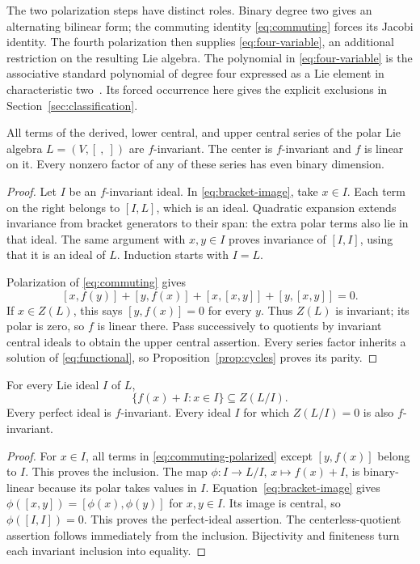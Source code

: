 The two polarization steps have distinct roles. Binary degree two gives
an alternating bilinear form; the commuting identity
\eqref{eq:commuting} forces its Jacobi identity. The fourth polarization
then supplies \eqref{eq:four-variable}, an additional restriction on the
resulting Lie algebra.
The polynomial in \eqref{eq:four-variable} is the associative standard
polynomial of degree four expressed as a Lie element in characteristic
two~\cite[Theorem~9]{Drensky2021}. Its forced occurrence here gives the
explicit exclusions in Section~\ref{sec:classification}.

\begin{proposition}\label{prop:invariant-series}
All terms of the derived, lower central, and upper central series of the
polar Lie algebra \(L=(V,[\ ,\ ])\) are \(f\)-invariant.
The center is \(f\)-invariant and \(f\) is linear on it.
Every nonzero factor of any of these series has even binary dimension.
\end{proposition}
\begin{proof}
Let \(I\) be an \(f\)-invariant ideal. In
\eqref{eq:bracket-image}, take \(x\in I\). Each term on the right belongs
to \([I,L]\), which is an ideal. Quadratic expansion extends invariance
from bracket generators to their span: the extra polar terms also lie in
that ideal. The same argument with \(x,y\in I\) proves invariance of
\([I,I]\), using that it is an ideal of \(L\).
Induction starts with \(I=L\).

Polarization of \eqref{eq:commuting} gives
\begin{equation}\label{eq:commuting-polarized}
 [x,f(y)]+[y,f(x)]+[x,[x,y]]+[y,[x,y]]=0.
\end{equation}
If \(x\in Z(L)\), this says \([y,f(x)]=0\) for every \(y\).
Thus \(Z(L)\) is invariant; its polar is zero, so \(f\) is linear there.
Pass successively to quotients by invariant central ideals to obtain
the upper central assertion. Every series factor inherits a solution of
\eqref{eq:functional}, so Proposition~\ref{prop:cycles} proves its parity.
\end{proof}

\begin{lemma}\label{lem:ideal-descent}
For every Lie ideal \(I\) of \(L\),
\[
 \{f(x)+I:x\in I\}\subseteq Z(L/I).
\]
Every perfect ideal is \(f\)-invariant. Every ideal \(I\) for which
\(Z(L/I)=0\) is also \(f\)-invariant.
\end{lemma}
\begin{proof}
For \(x\in I\), all terms in \eqref{eq:commuting-polarized} except
\([y,f(x)]\) belong to \(I\). This proves the inclusion.
The map \(\phi:I\to L/I\), \(x\mapsto f(x)+I\), is binary-linear
because its polar takes values in \(I\).
Equation~\eqref{eq:bracket-image} gives
\(\phi([x,y])=[\phi(x),\phi(y)]\) for \(x,y\in I\).
Its image is central, so \(\phi([I,I])=0\). This proves the perfect-ideal
assertion. The centerless-quotient assertion follows immediately from
the inclusion. Bijectivity and finiteness turn each invariant inclusion
into equality.
\end{proof}

